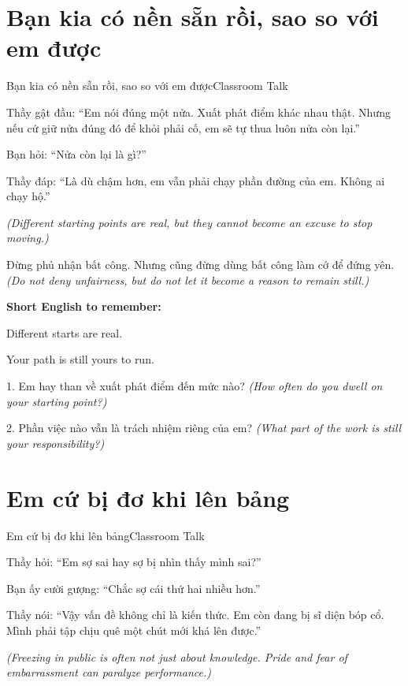 \section{Bạn kia có nền sẵn rồi, sao so với em được}
\begin{truyen}{Bạn kia có nền sẵn rồi, sao so với em được}{Classroom Talk}

Thầy gật đầu: ``Em nói đúng một nửa. Xuất phát điểm khác nhau thật. Nhưng nếu cứ giữ nửa đúng đó để khỏi phải cố, em sẽ tự thua luôn nửa còn lại.''

Bạn hỏi: ``Nửa còn lại là gì?''

Thầy đáp: ``Là dù chậm hơn, em vẫn phải chạy phần đường của em. Không ai chạy hộ.''

\textit{(Different starting points are real, but they cannot become an excuse to stop moving.)}
\end{truyen}

\begin{baihoc}
Đừng phủ nhận bất công. Nhưng cũng đừng dùng bất công làm cớ để đứng yên.
\textit{(Do not deny unfairness, but do not let it become a reason to remain still.)}
\end{baihoc}

\begin{ghinhoanh}
\textbf{Short English to remember:}

Different starts are real.

Your path is still yours to run.
\end{ghinhoanh}

\begin{tuhocnhanh}
1. Em hay than về xuất phát điểm đến mức nào? \textit{(How often do you dwell on your starting point?)}

2. Phần việc nào vẫn là trách nhiệm riêng của em? \textit{(What part of the work is still your responsibility?)}
\end{tuhocnhanh}
\ngancach

\section{Em cứ bị đơ khi lên bảng}
\begin{truyen}{Em cứ bị đơ khi lên bảng}{Classroom Talk}

Thầy hỏi: ``Em sợ sai hay sợ bị nhìn thấy mình sai?''

Bạn ấy cười gượng: ``Chắc sợ cái thứ hai nhiều hơn.''

Thầy nói: ``Vậy vấn đề không chỉ là kiến thức. Em còn đang bị sĩ diện bóp cổ. Mình phải tập chịu quê một chút mới khá lên được.''

\textit{(Freezing in public is often not just about knowledge. Pride and fear of embarrassment can paralyze performance.)}
\end{truyen}

